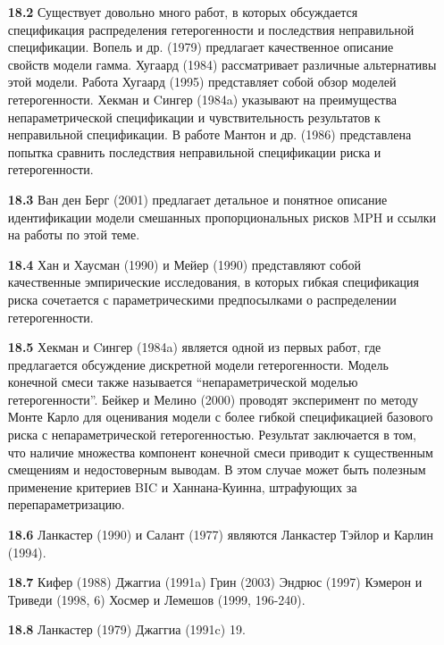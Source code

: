 \noindent

\begin{itemize}
    \item[\textbf{18.2}]
Существует довольно много работ, в которых обсуждается спецификация распределения гетерогенности и последствия неправильной спецификации. Вопель и др. (1979) предлагает качественное описание свойств модели гамма. Хугаард (1984) рассматривает различные альтернативы этой модели. Работа Хугаард (1995) представляет собой обзор моделей гетерогенности. Хекман и Cингер (1984a) указывают на преимущества непараметрической спецификации и чувствительность результатов к неправильной спецификации. В работе Мантон и др. (1986) представлена попытка сравнить последствия неправильной спецификации риска и гетерогенности.

    \item[\textbf{18.3}]
Ван ден Берг (2001) предлагает детальное и понятное описание идентификации модели смешанных пропорциональных рисков MPH и ссылки на работы по этой теме.

    \item[\textbf{18.4}]
Хан и Хаусман (1990) и Мейер (1990) представляют собой качественные эмпирические исследования, в которых гибкая спецификация риска сочетается с параметрическими предпосылками о распределении гетерогенности.

    \item[\textbf{18.5}]
Хекман и Cингер (1984a) является одной из первых работ, где предлагается обсуждение дискретной модели гетерогенности. Модель конечной смеси также называется ``непараметрической моделью гетерогенности''. Бейкер и Мелино (2000) проводят эксперимент по методу Монте Карло для оценивания модели с более гибкой спецификацией базового риска с непараметрической гетерогенностью. Результат заключается в том, что наличие множества компонент конечной смеси приводит к существенным смещениям и недостоверным выводам. В этом случае может быть полезным применение критериев BIC и Ханнана-Куинна, штрафующих за перепараметризацию.

    \item[\textbf{18.6}]
Ланкастер (1990) и Салант (1977) являются
Ланкастер
Тэйлор и Карлин (1994).
    \item[\textbf{18.7}]
Кифер (1988)
Джаггиа (1991a)
Грин (2003)
Эндрюс (1997)
Кэмерон и Триведи (1998, 6)
Хосмер и Лемешов (1999, 196-240).
    \item[\textbf{18.8}]
Ланкастер (1979)
Джаггиа (1991c)
19.
\end{itemize}




